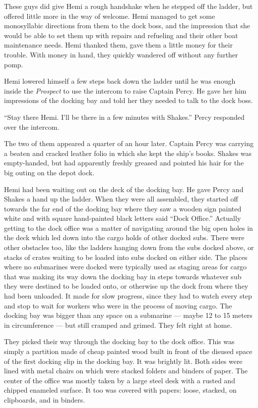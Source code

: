 \documentclass[
]{scrbook}
\begin{document}
These guys did give Hemi a rough handshake when he stepped off the
ladder, but offered little more in the way of welcome. Hemi managed to
get some monosyllabic directions from them to the dock boss, and the
impression that she would be able to set them up with repairs and
refueling and their other boat maintenance needs. Hemi thanked them,
gave them a little money for their trouble. With money in hand, they
quickly wandered off without any further pomp.

Hemi lowered himself a few steps back down the ladder until he was
enough inside the \emph{Prospect} to use the intercom to raise Captain
Percy. He gave her him impressions of the docking bay and told her they
needed to talk to the dock boss.

``Stay there Hemi. I'll be there in a few minutes with Shakes.'' Percy
responded over the intercom.

The two of them appeared a quarter of an hour later. Captain Percy was
carrying a beaten and cracked leather folio in which she kept the ship's
books. Shakes was empty-handed, but had apparently freshly greased and
pointed his hair for the big outing on the depot dock.

Hemi had been waiting out on the deck of the docking bay. He gave Percy
and Shakes a hand up the ladder. When they were all assembled, they
started off towards the far end of the docking bay where they saw a
wooden sign painted white and with square hand-painted black letters
said ``Dock Office.'' Actually getting to the dock office was a matter
of navigating around the big open holes in the deck which led down into
the cargo holds of other docked subs. There were other obstacles too,
like the ladders hanging down from the subs docked above, or stacks of
crates waiting to be loaded into subs docked on either side. The places
where no submarines were docked were typically used as staging areas for
cargo that was making its way down the docking bay in steps towards
whatever sub they were destined to be loaded onto, or otherwise up the
dock from where they had been unloaded. It made for slow progress, since
they had to watch every step and stop to wait for workers who were in
the process of moving cargo. The docking bay was bigger than any space
on a submarine --- maybe 12 to 15 meters in circumference --- but still
cramped and grimed. They felt right at home.

They picked their way through the docking bay to the dock office. This
was simply a partition made of cheap painted wood built in front of the
disused space of the first docking slip in the docking bay. It was
brightly lit. Both sides were lined with metal chairs on which were
stacked folders and binders of paper. The center of the office was
mostly taken by a large steel desk with a rusted and chipped enameled
surface. It too was covered with papers: loose, stacked, on clipboards,
and in binders.
\end{document}

